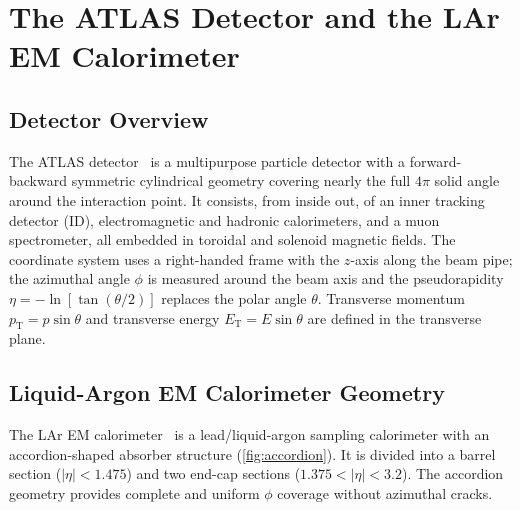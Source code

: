 \documentclass[11pt,a4paper]{article}
\newcommand{\abseta}{|\eta|}
\newcommand{\pt}{p_{\mathrm{T}}}
\begin{document}
\section{The ATLAS Detector and the LAr EM Calorimeter}
\label{sec:atlas}

\subsection{Detector Overview}
\label{sec:atlas:overview}

The ATLAS detector~\cite{ATLAS:2008} is a multipurpose particle
detector with a forward-backward symmetric cylindrical geometry
covering nearly the full $4\pi$ solid angle around the interaction
point.  It consists, from inside out, of an inner tracking detector
(ID), electromagnetic and hadronic calorimeters, and a muon
spectrometer, all embedded in toroidal and solenoid magnetic fields.
The coordinate system uses a right-handed frame with the $z$-axis
along the beam pipe; the azimuthal angle $\phi$ is measured around
the beam axis and the pseudorapidity $\eta = -\ln[\tan(\theta/2)]$
replaces the polar angle $\theta$.  Transverse momentum
$\pt = p\sin\theta$ and transverse energy $E_\mathrm{T} = E\sin\theta$
are defined in the transverse plane.

\subsection{Liquid-Argon EM Calorimeter Geometry}
\label{sec:atlas:lar}

The LAr EM calorimeter~\cite{LArTDR:1996,ATLAS:LAr_Run3} is a
lead/liquid-argon sampling calorimeter with an accordion-shaped
absorber structure (\cref{fig:accordion}).  It is divided into a
barrel section ($\abseta < 1.475$) and two end-cap sections
($1.375 < \abseta < 3.2$).  The accordion geometry provides
complete and uniform $\phi$ coverage without azimuthal cracks.
\end{document}
